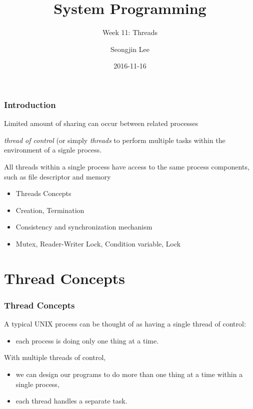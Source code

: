 \documentclass[newPxFont,sthlmFooter,nooffset]{beamer}
\title{System Programming}
\subtitle{Week 11: Threads}
\author[SJL]{Seongjin Lee}
\institute{\href{mailto:insight@hanyang.ac.kr}{insight@hanyang.ac.kr}\\\url{http://esos.hanyang.ac.kr}\\Esos Lab. Hanyang University}
\date{2016-11-16}
\begin{document}
\frame[plain]{\titlepage} 






\begin{frame}[t]
  \frametitle{Introduction}

Limited amount of sharing can occur between related processes

\textit{thread of control} (or simply \textit{threads} to perform multiple tasks within the environment of a signle process.

All threads within a single process have access to the same process components, such as file descriptor and memory


  \begin{itemize}
  \item Threads Concepts
  \item Creation, Termination
  \item Consistency and synchronization mechanism
  \item Mutex, Reader-Writer Lock, Condition variable, Lock
  \end{itemize}

\end{frame}

\section{Thread Concepts}



\begin{frame}[t]
  \frametitle{Thread Concepts}
A typical UNIX process can be thought of as having a single thread of control:
\begin{itemize}
\item each process is doing only one thing at a time.
\end{itemize}

With multiple threads of control, 
\begin{itemize}
\item we can design our programs to do more than one thing at a time
  within a single process,
\item each thread handles a separate task.
\end{itemize}


\end{frame}
\end{document}
